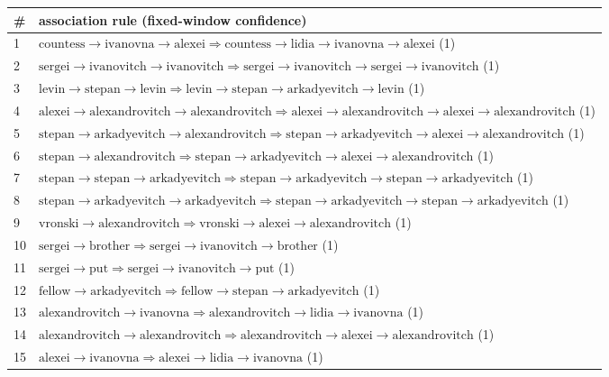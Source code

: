 \begin{appendices}
\begin{longtable}{p{20pt}|p{\dimexpr\textwidth-20pt-\tabcolsep\relax}}
\# & association rule (fixed-window confidence) \\
\hline
1 & $ \text{countess} \to \text{ivanovna} \to \text{alexei} \Rightarrow \text{countess} \to \text{lidia} \to \text{ivanovna} \to \text{alexei} $ (1) \\
2 & $ \text{sergei} \to \text{ivanovitch} \to \text{ivanovitch} \Rightarrow \text{sergei} \to \text{ivanovitch} \to \text{sergei} \to \text{ivanovitch} $ (1) \\
3 & $ \text{levin} \to \text{stepan} \to \text{levin} \Rightarrow \text{levin} \to \text{stepan} \to \text{arkadyevitch} \to \text{levin} $ (1) \\
4 & $ \text{alexei} \to \text{alexandrovitch} \to \text{alexandrovitch} \Rightarrow \text{alexei} \to \text{alexandrovitch} \to \text{alexei} \to \text{alexandrovitch} $ (1) \\
5 & $ \text{stepan} \to \text{arkadyevitch} \to \text{alexandrovitch} \Rightarrow \text{stepan} \to \text{arkadyevitch} \to \text{alexei} \to \text{alexandrovitch} $ (1) \\
6 & $ \text{stepan} \to \text{alexandrovitch} \Rightarrow \text{stepan} \to \text{arkadyevitch} \to \text{alexei} \to \text{alexandrovitch} $ (1) \\
7 & $ \text{stepan} \to \text{stepan} \to \text{arkadyevitch} \Rightarrow \text{stepan} \to \text{arkadyevitch} \to \text{stepan} \to \text{arkadyevitch} $ (1) \\
8 & $ \text{stepan} \to \text{arkadyevitch} \to \text{arkadyevitch} \Rightarrow \text{stepan} \to \text{arkadyevitch} \to \text{stepan} \to \text{arkadyevitch} $ (1) \\
9 & $ \text{vronski} \to \text{alexandrovitch} \Rightarrow \text{vronski} \to \text{alexei} \to \text{alexandrovitch} $ (1) \\
10 & $ \text{sergei} \to \text{brother} \Rightarrow \text{sergei} \to \text{ivanovitch} \to \text{brother} $ (1) \\
11 & $ \text{sergei} \to \text{put} \Rightarrow \text{sergei} \to \text{ivanovitch} \to \text{put} $ (1) \\
12 & $ \text{fellow} \to \text{arkadyevitch} \Rightarrow \text{fellow} \to \text{stepan} \to \text{arkadyevitch} $ (1) \\
13 & $ \text{alexandrovitch} \to \text{ivanovna} \Rightarrow \text{alexandrovitch} \to \text{lidia} \to \text{ivanovna} $ (1) \\
14 & $ \text{alexandrovitch} \to \text{alexandrovitch} \Rightarrow \text{alexandrovitch} \to \text{alexei} \to \text{alexandrovitch} $ (1) \\
15 & $ \text{alexei} \to \text{ivanovna} \Rightarrow \text{alexei} \to \text{lidia} \to \text{ivanovna} $ (1) \\
\end{longtable}


\end{appendices}
